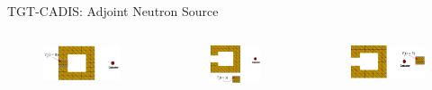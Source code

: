 \documentclass{beamer}
\begin{document}
\begin{frame}{TGT-CADIS: Adjoint Neutron Source}
	\begin{columns}
		\begin{column}{0.3\textwidth}
        \begin{figure}
	\centering
		\vspace{-0.4cm}
	\includegraphics[scale=0.20]{mesh-0.jpg}
	\end{figure}
\end{column}
\vrule{}
		\begin{column}{0.3\textwidth}
		\vspace{0.6cm}
        \begin{figure}
	\centering
	\includegraphics[scale=0.20]{mesh-3.jpg}
	\end{figure}
\end{column}
\vrule{}
		\begin{column}{0.3\textwidth}
		\vspace{-0.4cm}
        \begin{figure}
	\centering
	\includegraphics[scale=0.20]{mesh-5.jpg}
	\end{figure}
\end{column}
	\end{columns}


\end{frame}
\end{document}
